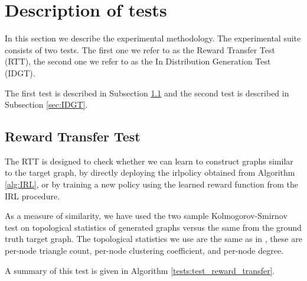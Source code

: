 \documentclass{report}
\numberwithin{equation}{section}
\numberwithin{figure}{section}
\numberwithin{table}{section}
\numberwithin{algorithm}{section}
\begin{document}


\section{Description of tests}
\label{sec:test_description}
In this section we describe the experimental methodology. 
The experimental suite consists of two tests. The 
first one we refer to as the Reward Transfer Test (RTT), the second 
one we refer to as the In Distribution Generation Test (IDGT). 

The first test is described in Subsection \ref{sec:RTT} and the 
second test is described in Subsection \ref{sec:IDGT}. 

\subsection{Reward Transfer Test}
\label{sec:RTT}
The RTT is designed to check whether we can learn to construct 
graphs similar to the target graph, by directly deploying the 
irlpolicy obtained from Algorithm \ref{alg:IRL}, or by training 
a new policy using the learned reward function from the IRL procedure.

As a measure of similarity, we have used the two sample Kolmogorov-Smirnov 
test \citep{KStest3} on topological statistics of generated graphs 
versus the same from the ground truth target graph. The topological 
statistics we use are the same as in \cite{GraphOpt}, these are 
per-node triangle count, per-node clustering coefficient, 
and per-node degree.

A summary of this test is given in Algorithm \ref{tests:test_reward_transfer}.
\end{document}
